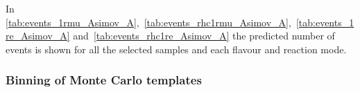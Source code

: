 \begin{itemize}
\end{itemize}

In \cref{tab:events_1rmu_Asimov_A},~\ref{tab:events_rhc1rmu_Asimov_A},~\ref{tab:events_1re_Asimov_A} 
and~\ref{tab:events_rhc1re_Asimov_A}
the predicted number of events is shown for all the selected samples 
and each flavour and reaction mode.









\subsubsection {Binning of Monte Carlo templates}
\label{sec:mc_templates:template_binning}


